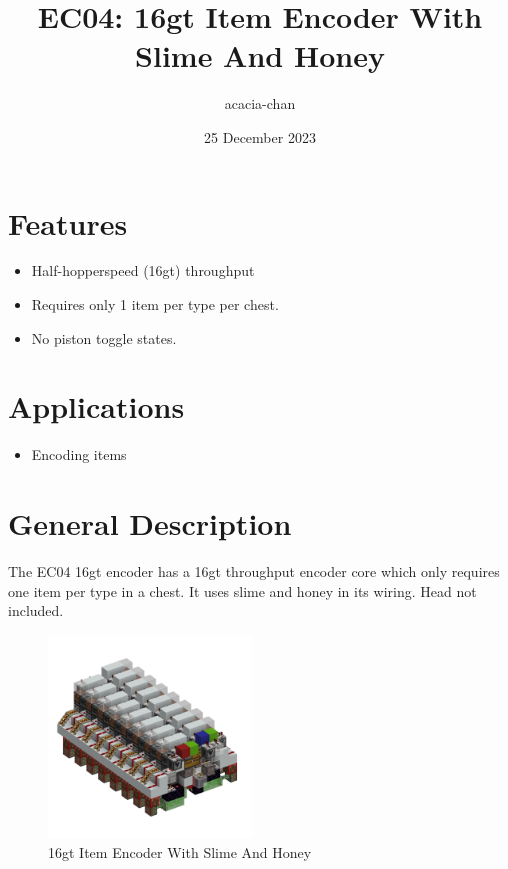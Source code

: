 \documentclass[10pt]{datasheet}
\title{EC04: 16gt Item Encoder With Slime And Honey}
\author{acacia-chan}
\date{25 December 2023}
\begin{document}
\maketitle

\section{Features}
\begin{itemize}
\item{Half-hopperspeed (16gt) throughput}
\item{Requires only 1 item per type per chest.}
\item{No piston toggle states.}
\end{itemize}

\section{Applications}

\begin{itemize}
\item{Encoding items}
\end{itemize}

\section{General Description}
The EC04 16gt encoder has a 16gt throughput encoder core which only requires one item per type in a chest. It uses slime and honey in its wiring. Head not included.

\vfill\break

\begin{figure}[h]
    \centering
    \includegraphics[width=0.48\textwidth]{area_render.png}
    \caption{\centering 16gt Item Encoder With Slime And Honey}
\end{figure}

\onecolumn
\end{document}

